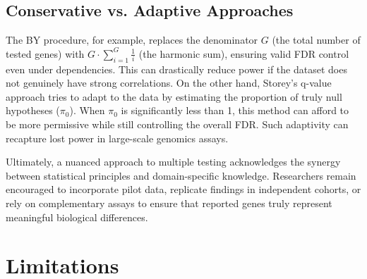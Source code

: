 \documentclass[12pt]{article}
\begin{document}
\subsection{Conservative vs. Adaptive Approaches}
The BY procedure, for example, replaces the denominator $G$ (the total number of tested genes) with $G \cdot \sum_{i=1}^G \frac{1}{i}$ (the harmonic sum), ensuring valid FDR control even under dependencies. This can drastically reduce power if the dataset does not genuinely have strong correlations. On the other hand, Storey’s q-value approach tries to adapt to the data by estimating the proportion of truly null hypotheses ($\pi_0$). When $\pi_0$ is significantly less than 1, this method can afford to be more permissive while still controlling the overall FDR. Such adaptivity can recapture lost power in large-scale genomics assays.

Ultimately, a nuanced approach to multiple testing acknowledges the synergy between statistical principles and domain-specific knowledge. Researchers remain encouraged to incorporate pilot data, replicate findings in independent cohorts, or rely on complementary assays to ensure that reported genes truly represent meaningful biological differences.

\section*{Limitations}
\end{document}
